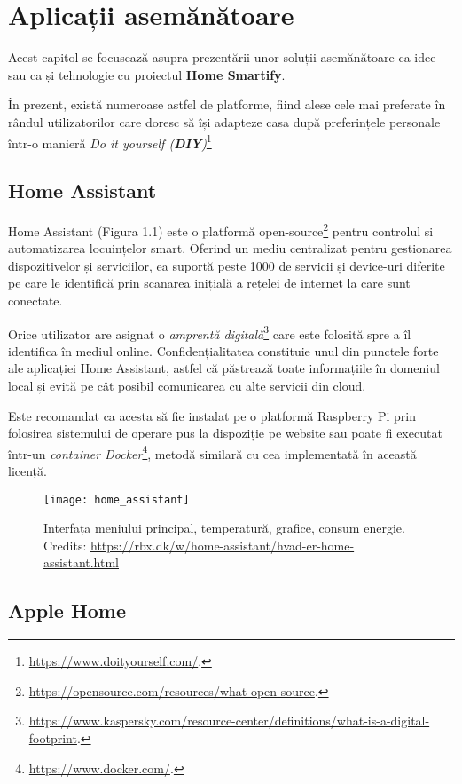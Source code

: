 \chapter{Aplicații asemănătoare}

Acest capitol se focusează asupra prezentării unor soluții asemănătoare ca idee sau ca și tehnologie cu proiectul \textbf{Home Smartify}. 

În prezent, există numeroase astfel de platforme, fiind alese cele mai preferate în rândul utilizatorilor care doresc să își adapteze casa după preferințele personale într-o manieră \emph{Do it yourself (\textbf{DIY})}\footnote{\url{https://www.doityourself.com/}.}

\section{Home Assistant}

Home Assistant (Figura 1.1) este o platformă open-source\footnote{\url{https://opensource.com/resources/what-open-source}.} pentru controlul și automatizarea locuințelor smart. Oferind un mediu centralizat pentru gestionarea dispozitivelor și serviciilor, ea suportă peste 1000 de servicii și device-uri diferite pe care le identifică prin scanarea inițială a rețelei de internet la care sunt conectate.

Orice utilizator are asignat o \emph{amprentă digitală}\footnote{\url{https://www.kaspersky.com/resource-center/definitions/what-is-a-digital-footprint}.} care este folosită spre a îl identifica în mediul online. Confidențialitatea constituie unul din punctele forte ale aplicației Home Assistant, astfel că păstrează toate informațiile în domeniul local și evită pe cât posibil comunicarea cu alte servicii din cloud.

Este recomandat ca acesta să fie instalat pe o platformă Raspberry Pi prin folosirea sistemului de operare pus la dispoziție pe website sau poate fi executat într-un \emph{container Docker}\footnote{\url{https://www.docker.com/}.}, metodă similară cu cea implementată în această licență.

\begin{figure}[h]
	\centering
	\texttt{[image: home\_assistant]}
	\caption{Interfața meniului principal, temperatură, grafice, consum energie.
			Credits: \url{https://rbx.dk/w/home-assistant/hvad-er-home-assistant.html}}
	\label{fig:home_assistant}
\end{figure}

\section{Apple Home}

